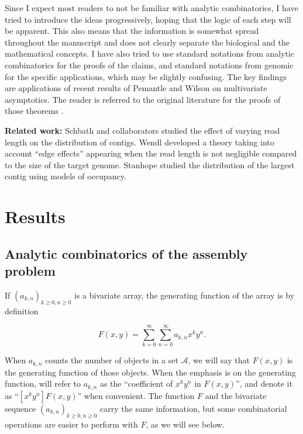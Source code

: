 \documentclass{article}
\begin{document}
Since I expect most readers to not be familiar with analytic
combinatorics, I have tried to introduce the ideas progressively, hoping
that the logic of each step will be apparent. This also means that the
information is somewhat spread throughout the manuscript and does not
clearly separate the biological and the mathematical concepts. I have also
tried to use standard notations from analytic combinatorics for the proofs
of the claims, and standard notations from genomic for the specific
applications, which may be slightly confusing.  The key findings are
applications of recent results of Pemantle and Wilson on multivariate
asymptotics. The reader is referred to the original literature for the
proofs of those theorems \cite{PemWil08,AnalComb2013}.

\textbf{Related work:} Schbath and collaborators \cite{pmid10890387}
studied the effect of varying read length on the distribution of contigs.
Wendl \cite{pmid16901236} developed a theory taking into account ``edge
effects'' appearing when the read length is not negligible compared to the
size of the target genome. Stanhope \cite{pmid20686599} studied the
distribution of the largest contig using models of occupancy.


\section{Results}

\subsection{Analytic combinatorics of the assembly problem}
\label{sec:config}

If $(a_{k,n})_{k \geq 0, n \geq 0}$ is a bivariate array, the generating
function of the array is by definition

\begin{equation*}
F(x,y) = \sum_{k=0}^\infty \sum_{n=0}^\infty a_{k,n}x^ky^n.
\end{equation*}

When $a_{k,n}$ counts the number of objects in a set $\mathcal{A}$, we
will say that $F(x,y)$ is the generating function of those objects. When
the emphasis is on the generating function, will refer to $a_{k,n}$ as the
``coefficient of $x^ky^n$ in $F(x,y)$'', and denote it as ``$[x^ky^n]
F(x,y)$'' when convenient. The function $F$ and the bivariate sequence
$(a_{k,n})_{k \geq 0, n \geq 0}$ carry the same information, but some
combinatorial operations are easier to perform with $F$, as we will see
below.
\end{document}

